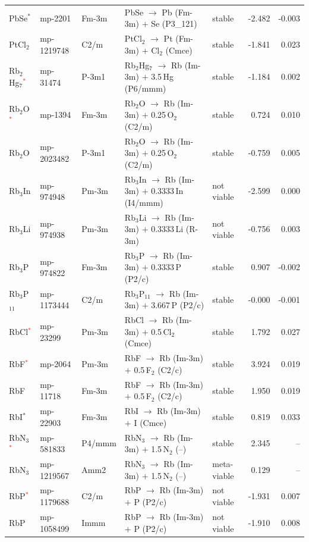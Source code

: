\begin{longtable}{@{}ll l@{\hspace{4pt}} p{4.6cm} l@{\hspace{4pt}} rr@{}}
PbSe$^*$ & mp-2201 & Fm-3m & PbSe $\to$ Pb (Fm-3m) $+$ Se (P3\_121) & stable & -2.482 & -0.003 \\
PtCl$_{2}$ & mp-1219748 & C2/m & PtCl$_{2}$ $\to$ Pt (Fm-3m) $+$ Cl$_{2}$ (Cmce) & stable & -1.841 & 0.023 \\
Rb$_{2}$Hg$_{7}$\textcolor{red}{$^*$} & mp-31474 & P-3m1 & Rb$_{2}$Hg$_{7}$ $\to$ Rb (Im-3m) $+$ 3.5\,Hg (P6/mmm) & stable & -1.184 & 0.002 \\
Rb$_{2}$O\textcolor{red}{$^*$} & mp-1394 & Fm-3m & Rb$_{2}$O $\to$ Rb (Im-3m) $+$ 0.25\,O$_{2}$ (C2/m) & stable & 0.724 & 0.010 \\
Rb$_{2}$O & mp-2023482 & P-3m1 & Rb$_{2}$O $\to$ Rb (Im-3m) $+$ 0.25\,O$_{2}$ (C2/m) & stable & -0.759 & 0.005 \\
Rb$_{3}$In & mp-974948 & Pm-3m & Rb$_{3}$In $\to$ Rb (Im-3m) $+$ 0.3333\,In (I4/mmm) & not viable & -2.599 & 0.000 \\
Rb$_{3}$Li & mp-974938 & Pm-3m & Rb$_{3}$Li $\to$ Rb (Im-3m) $+$ 0.3333\,Li (R-3m) & not viable & -0.756 & 0.003 \\
Rb$_{3}$P & mp-974822 & Fm-3m & Rb$_{3}$P $\to$ Rb (Im-3m) $+$ 0.3333\,P (P2/c) & stable & 0.907 & -0.002 \\
Rb$_{3}$P$_{11}$ & mp-1173444 & C2/m & Rb$_{3}$P$_{11}$ $\to$ Rb (Im-3m) $+$ 3.667\,P (P2/c) & stable & -0.000 & -0.001 \\
RbCl\textcolor{red}{$^*$} & mp-23299 & Pm-3m & RbCl $\to$ Rb (Im-3m) $+$ 0.5\,Cl$_{2}$ (Cmce) & stable & 1.792 & 0.027 \\
RbF\textcolor{red}{$^*$} & mp-2064 & Pm-3m & RbF $\to$ Rb (Im-3m) $+$ 0.5\,F$_{2}$ (C2/c) & stable & 3.924 & 0.019 \\
RbF & mp-11718 & Fm-3m & RbF $\to$ Rb (Im-3m) $+$ 0.5\,F$_{2}$ (C2/c) & stable & 1.950 & 0.019 \\
RbI$^*$ & mp-22903 & Fm-3m & RbI $\to$ Rb (Im-3m) $+$ I (Cmce) & stable & 0.819 & 0.033 \\
RbN$_{3}$\textcolor{red}{$^*$} & mp-581833 & P4/mmm & RbN$_{3}$ $\to$ Rb (Im-3m) $+$ 1.5\,N$_{2}$ (--) & stable & 2.345 & -- \\
RbN$_{3}$ & mp-1219567 & Amm2 & RbN$_{3}$ $\to$ Rb (Im-3m) $+$ 1.5\,N$_{2}$ (--) & meta-viable & 0.129 & -- \\
RbP\textcolor{red}{$^*$} & mp-1179688 & C2/m & RbP $\to$ Rb (Im-3m) $+$ P (P2/c) & not viable & -1.931 & 0.007 \\
RbP & mp-1058499 & Immm & RbP $\to$ Rb (Im-3m) $+$ P (P2/c) & not viable & -1.910 & 0.008 \\

\end{longtable}
